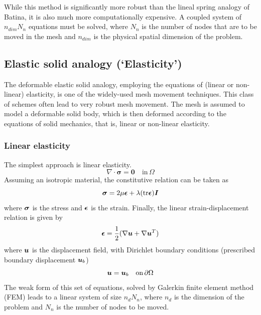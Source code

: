  While this method is significantly more robust than the lineal spring analogy of Batina, it is also much more computationally expensive. A coupled system of $n_{dim} N_n$ equations must be solved, where $N_n$ is the number of nodes that are to be moved in the mesh and $n_{dim}$ is the physical spatial dimension of the problem.
 
 \subsection{Elastic solid analogy (`Elasticity')}
 
 The deformable elastic solid analogy, employing the equations of (linear or non-linear) elasticity, is one of the widely-used mesh movement techniques. This class of schemes often lead to very robust mesh movement. The mesh is assumed to model a deformable solid body, which is then deformed according to the equations of solid mechanics, that is, linear or non-linear elasticity.
 
 \subsubsection{Linear elasticity}
 
 The simplest approach is linear elasticity.
 \begin{equation}
 \nabla \cdot \mathbf{\sigma}  = \mathbf{0} \quad \text{in} \, \Omega
 \end{equation}
 Assuming an isotropic material, the constitutive relation can be taken as
 \begin{equation}
 \boldsymbol{\sigma} = 2\mu\boldsymbol{\epsilon} + \lambda (\mathrm{tr}\boldsymbol{\epsilon}) \boldsymbol{I}
 \label{linelast:constt}
 \end{equation}
 where $\boldsymbol{\sigma}$ is the stress and $\boldsymbol{\epsilon}$ is the strain.
 Finally, the linear strain-displacement relation is given by
 \begin{equation}
 \boldsymbol{\epsilon} = \frac12 (\nabla\boldsymbol{u}+\nabla\boldsymbol{u}^T)
 \label{linelast:strain}
 \end{equation}
 where $\boldsymbol{u}$ is the displacement field, with Dirichlet boundary conditions (prescribed boundary displacement $\boldsymbol{u}_b$)
 \begin{equation}
 \boldsymbol{u} = \boldsymbol{u}_b \quad \text{on} \, \partial\Omega
 \end{equation}
 The weak form of this set of equations, solved by Galerkin finite element method (FEM) leads to a linear system of size $n_d N_n$, where $n_d$ is the dimension of the problem and $N_n$ is the number of nodes to be moved.
 
